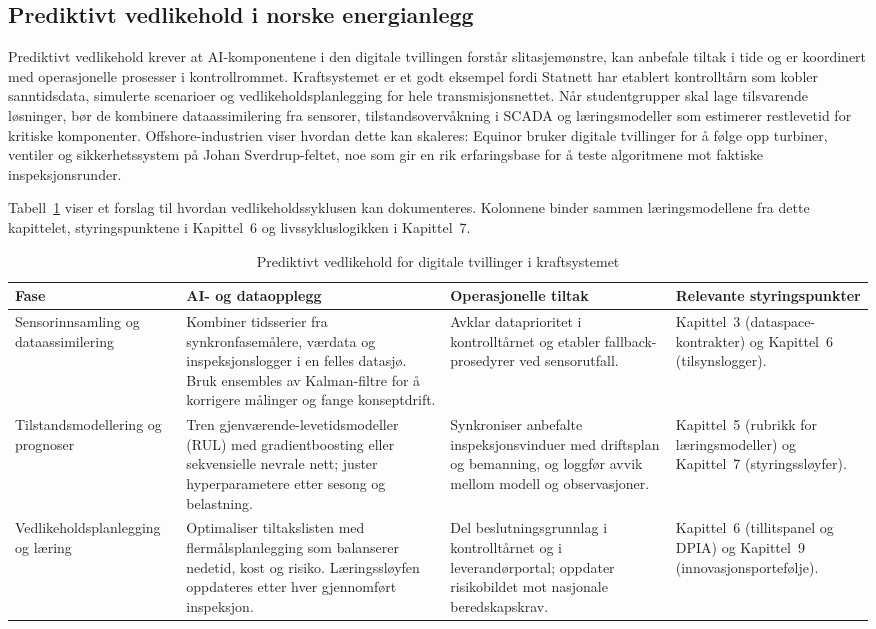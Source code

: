 \subsection{Prediktivt vedlikehold i norske energianlegg}
Prediktivt vedlikehold krever at AI-komponentene i den digitale tvillingen forstår slitasjemønstre, kan anbefale tiltak i tide og er koordinert med operasjonelle prosesser i kontrollrommet. Kraftsystemet er et godt eksempel fordi Statnett har etablert kontrolltårn som kobler sanntidsdata, simulerte scenarioer og vedlikeholdsplanlegging for hele transmisjonsnettet.\citep{statnett2024kontrolltarn} Når studentgrupper skal lage tilsvarende løsninger, bør de kombinere dataassimilering fra sensorer, tilstandsovervåkning i SCADA og læringsmodeller som estimerer restlevetid for kritiske komponenter. Offshore-industrien viser hvordan dette kan skaleres: Equinor bruker digitale tvillinger for å følge opp turbiner, ventiler og sikkerhetssystem på Johan Sverdrup-feltet, noe som gir en rik erfaringsbase for å teste algoritmene mot faktiske inspeksjonsrunder.\citep{equinor2021johansverdrup}

Tabell~\ref{tab:vedlikehold-kraft} viser et forslag til hvordan vedlikeholdssyklusen kan dokumenteres. Kolonnene binder sammen læringsmodellene fra dette kapittelet, styringspunktene i Kapittel~6 og livssykluslogikken i Kapittel~7.

\begin{table}[htbp]
    \centering
    \caption{Prediktivt vedlikehold for digitale tvillinger i kraftsystemet}
    \label{tab:vedlikehold-kraft}
    \begin{tabular}{p{3.6cm}p{4.4cm}p{3.6cm}p{3.6cm}}
        \toprule
        \textbf{Fase} & \textbf{AI- og dataopplegg} & \textbf{Operasjonelle tiltak} & \textbf{Relevante styringspunkter} \\
        \midrule
        Sensorinnsamling og dataassimilering & Kombiner tidsserier fra synkronfasemålere, værdata og inspeksjonslogger i en felles datasjø. Bruk ensembles av Kalman-filtre for å korrigere målinger og fange konseptdrift. & Avklar dataprioritet i kontrolltårnet og etabler fallback-prosedyrer ved sensorutfall. & Kapittel~3 (dataspace-kontrakter) og Kapittel~6 (tilsynslogger). \\
        \addlinespace
        Tilstandsmodellering og prognoser & Tren gjenværende-levetidsmodeller (RUL) med gradientboosting eller sekvensielle nevrale nett; juster hyperparametere etter sesong og belastning. & Synkroniser anbefalte inspeksjonsvinduer med driftsplan og bemanning, og loggfør avvik mellom modell og observasjoner. & Kapittel~5 (rubrikk for læringsmodeller) og Kapittel~7 (styringssløyfer). \\
        \addlinespace
        Vedlikeholdsplanlegging og læring & Optimaliser tiltakslisten med flermålsplanlegging som balanserer nedetid, kost og risiko. Læringssløyfen oppdateres etter hver gjennomført inspeksjon. & Del beslutningsgrunnlag i kontrolltårnet og i leverandørportal; oppdater risikobildet mot nasjonale beredskapskrav. & Kapittel~6 (tillitspanel og DPIA) og Kapittel~9 (innovasjonsportefølje). \\
        \bottomrule
    \end{tabular}
\end{table}

